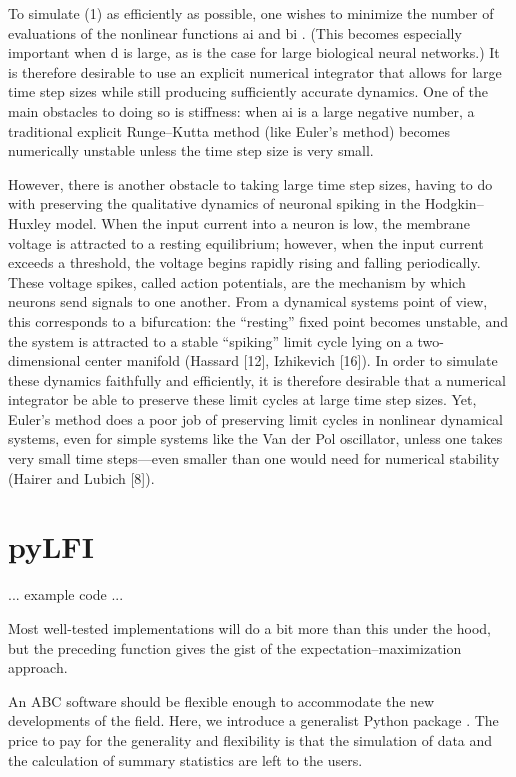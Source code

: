 To simulate (1) as efficiently as possible, one wishes to minimize the number of evaluations
of the nonlinear functions ai and bi
. (This becomes especially important when d is large,
as is the case for large biological neural networks.) It is therefore desirable to use an
explicit numerical integrator that allows for large time step sizes while still producing
sufficiently accurate dynamics. One of the main obstacles to doing so is stiffness: when ai
is
a large negative number, a traditional explicit Runge–Kutta method (like Euler’s method)
becomes numerically unstable unless the time step size is very small. 


However, there is another obstacle to taking large time step sizes, having to do with
preserving the qualitative dynamics of neuronal spiking in the Hodgkin–Huxley model.
When the input current into a neuron is low, the membrane voltage is attracted to a
resting equilibrium; however, when the input current exceeds a threshold, the voltage begins
rapidly rising and falling periodically. These voltage spikes, called action potentials, are the
mechanism by which neurons send signals to one another. From a dynamical systems point
of view, this corresponds to a bifurcation: the “resting” fixed point becomes unstable, and
the system is attracted to a stable “spiking” limit cycle lying on a two-dimensional center
manifold (Hassard [12], Izhikevich [16]). In order to simulate these dynamics faithfully and
efficiently, it is therefore desirable that a numerical integrator be able to preserve these limit
cycles at large time step sizes. Yet, Euler’s method does a poor job of preserving limit cycles
in nonlinear dynamical systems, even for simple systems like the Van der Pol oscillator,
unless one takes very small time steps—even smaller than one would need for numerical
stability (Hairer and Lubich [8]).

\section{pyLFI}\label{sec:pylfi}

... example code ...

Most well-tested implementations will do a bit more than this under the hood, but the preceding function gives the gist of the expectation–maximization approach.

An ABC software should be flexible enough to accommodate the new developments of the field. Here, we introduce a generalist Python package . The price to pay for the generality and flexibility is that the simulation of data and the calculation of summary statistics are left to the users. 

